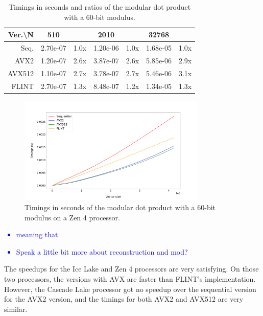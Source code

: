 \documentclass[a4paper]{article}
\begin{document}
\begin{table}[h!]
\begin{tabular}{|r|*{3}{c c|}}
        \hline
        \rowcolor{myGray}
        Ver.\textbackslash N & 510 & & 2010 & & 32768 & \\
        \hline
        \cellcolor{myGray} Seq. & 2.70e-07 & 1.0x & 1.20e-06 & 1.0x & 1.68e-05 & 1.0x \\
        \hline
        \cellcolor{myGray} AVX2 & 1.20e-07 & 2.6x & 3.87e-07 & 2.6x & 5.85e-06 & 2.9x \\
        \hline
        \cellcolor{myGray} AVX512 & 1.10e-07 & 2.7x & 3.78e-07 & 2.7x & 5.46e-06 & 3.1x \\
        \hline
        \cellcolor{myGray} FLINT & 2.70e-07 & 1.3x & 8.48e-07 & 1.2x & 1.34e-05 & 1.3x \\
        \hline
    \end{tabular}
    \caption{Timings in seconds and ratios of the modular dot product with a 60-bit modulus.}
\end{table}

\begin{figure}[h!]
    \begin{center}
        \includegraphics[width=0.8\textwidth]{dot-prod-mod_argiope.png}
    \end{center}
    \caption{Timings in seconds of the modular dot product with a 60-bit modulus on a Zen 4 processor.}
\end{figure}

\textcolor{blue}{
    \begin{itemize}
        \item meaning that
        \item Speak a little bit more about reconstruction and mod?
    \end{itemize}
}

The speedups for the Ice Lake and Zen 4 processors are very satisfying. On those
two processors, the versions with AVX are faster than FLINT's implementation.
However, the Cascade Lake processor got no speedup over the sequential version
for the AVX2 version, and the timings for both AVX2 and AVX512 are very similar.
\end{document}
